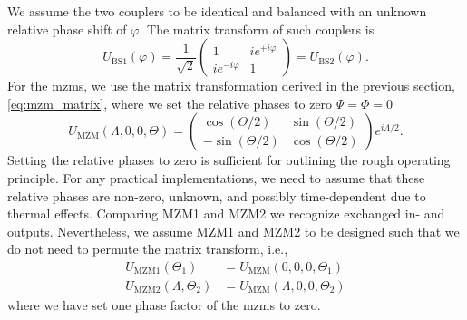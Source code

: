 We assume the two couplers to be identical and balanced with an unknown relative phase shift of $\varphi$.
The matrix transform of such couplers is
\begin{equation}
	U_\text{BS1}(\varphi)
	=
	\frac{1}{\sqrt{2}}
	\begin{pmatrix}
		1 & ie^{+i\varphi} \\
		ie^{-i\varphi} & 1
	\end{pmatrix}
	=
	U_\text{BS2}(\varphi)
	.
\end{equation}
For the \gls{mzm}s, we use the matrix transformation derived in the previous section, \cref{eq:mzm_matrix}, where we set the relative phases to zero $\Psi=\Phi=0$
\begin{equation}
	U_\text{MZM}(\Lambda,0,0,\Theta)
	=
	\begin{pmatrix}
		\cos(\Theta/2) & \sin(\Theta/2) \\
		-\sin(\Theta/2) & \cos(\Theta/2)
	\end{pmatrix}
	e^{i\Lambda/2}
	.
\end{equation}
Setting the relative phases to zero is sufficient for outlining the rough operating principle.
For any practical implementations, we need to assume that these relative phases are non-zero, unknown, and possibly time-dependent due to thermal effects.
Comparing MZM1 and MZM2 we recognize exchanged in- and outputs.
Nevertheless, we assume MZM1 and MZM2 to be designed such that we do not need to permute the matrix transform, i.e.,
\begin{align}
	U_\text{MZM1}(\Theta_1)
	&=
	U_\text{MZM}(0,0,0,\Theta_1)
	\\
	U_\text{MZM2}(\Lambda,\Theta_2)
	&=
	U_\text{MZM}(\Lambda,0,0,\Theta_2)
\end{align}
where we have set one phase factor of the \gls{mzm}s to zero.

